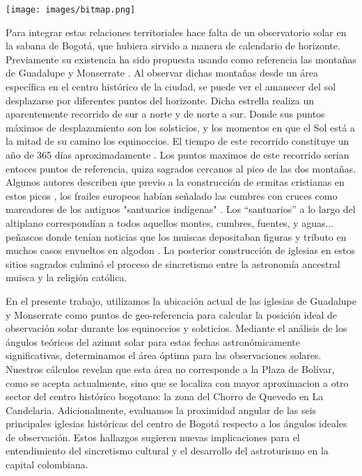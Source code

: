 \documentclass[a4paper,alpha-refs]{eSpectra}
\begin{document}
\smallskip
\centering
   \texttt{[image: images/bitmap.png]}
\justifying

\smallskip

Para integrar estas relaciones territoriales hace falta de un observatorio solar en la sabana de Bogotá, que hubiera sirvido a manera de calendario de horizonte. Previamente su existencia ha sido propuesta usando como referencia las montañas de Guadalupe y Monserrate \cite{bonilla_observatorio_2011}. Al observar dichas montañas desde un área específica en el centro histórico de la ciudad, se puede ver el amanecer del sol desplazarse por diferentes puntos del horizonte. Dicha estrella realiza un aparentemente recorrido de sur a norte y de norte a sur. Donde sus puntos máximos de desplazamiento son los solsticios, y los momentos en que el Sol está a la mitad de su camino los equinoccios. El tiempo de este recorrido constituye un año de 365 días aproximadamente \cite{quijano_astronomia_2021}. Los puntos maximos de este recorrido serian entoces puntos de referencia,  quiza sagrados cercanos al pico de las dos montañas.  Algunos autores describen que previo a la construcción de ermitas cristianas en estos picos , los frailes europeos habían señalado las cumbres con cruces como marcadores de los antiguos "santuarios indígenas" \cite{rodriguez_freyle_carnero_1997}. Los “santuarios” a lo largo del altiplano correspondían a todos aquellos montes, cumbres, fuentes, y  aguas... peñascos donde tenían noticias que los muiscas depositaban figuras y tributo en muchos casos envueltos en algodon  \cite{simon_noticias_historiales_1626}. La posterior construcción de iglesias en estos sitios sagrados culminó el proceso de sincretismo entre la astronomía ancestral muisca y la religión católica.


En el presente trabajo,  utilizamos la ubicación actual de las iglesias de Guadalupe y Monserrate como puntos de geo-referencia para calcular la posición ideal de observación solar durante los equinoccios y solsticios. Mediante el análisis de los ángulos teóricos del azimut solar para estas fechas astronómicamente significativas, determinamos el área óptima para las observaciones solares. Nuestros cálculos revelan que esta área no corresponde a la Plaza de Bolívar, como se acepta actualmente, sino que se localiza con mayor aproximacion a otro sector del centro histórico bogotano: la zona del Chorro de Quevedo en La Candelaria. Adicionalmente, evaluamos la proximidad angular de las seis principales iglesias históricas del centro de Bogotá respecto a los ángulos ideales de observación. Estos hallazgos sugieren nuevas implicaciones para el entendimiento del sincretismo cultural y el desarrollo del astroturismo en la capital colombiana.
\end{document}
